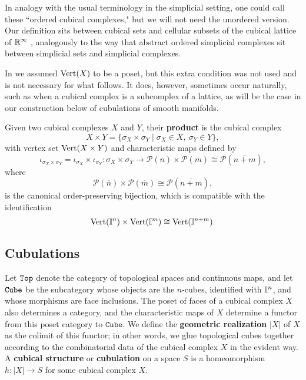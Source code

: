 In analogy with the usual terminology in the simplicial setting, one could call these ``ordered cubical complexes," but we will not need the unordered version.
Our definition sits between cubical sets \cite{jardine2002cubical} and cellular subsets of the cubical lattice of $\mathbb{R}^\infty$ \cite{kaczynski2006computational}, analogously to the way that abstract ordered simplicial complexes sit between simplicial sets and simplicial complexes.
\begin{comment}
	The following geometric realization construction makes our definition and the cubical lattice definition essentially equivalent.
\end{comment}

\begin{remark}
	In \cite{FMS-flows} we assumed ${\rm Vert}(X)$ to be a poset, but this extra condition was not used and is not necessary for what follows.
	It does, however, sometimes occur naturally, such as when a cubical complex is a subcomplex of a lattice, as will be the case in our construction below of cubulations of smooth manifolds.
\end{remark}

\noindent Given two cubical complexes $X$ and $Y$, their \textbf{product} is the cubical complex
\[
X \times Y = \{ \sigma_X \times \sigma_Y \mid \sigma_X \in X,\ \sigma_Y \in Y \},
\]
with vertex set ${\rm Vert}(X \times Y)$ and characteristic maps defined by
\[
\iota_{\sigma_X \times \sigma_Y} = \iota_{\sigma_X} \times \iota_{\sigma_Y} \colon \sigma_X \times \sigma_Y \to \mathcal{P}(\overline{n}) \times \mathcal{P}(\overline{m}) \cong \mathcal{P}(\overline{n + m}),
\]
where
\[
\mathcal{P}(\overline{n}) \times \mathcal{P}(\overline{m}) \cong \mathcal{P}(\overline{n + m}),
\]
is the canonical order-preserving bijection, which is compatible with the identification
\[
{\rm Vert}(\mathbb{I}^n) \times {\rm Vert}(\mathbb{I}^m) \cong {\rm Vert}(\mathbb{I}^{n + m}).
\]

\subsection{Cubulations}

Let ${\tt Top}$ denote the category of topological spaces and continuous maps, and let ${\tt Cube}$ be the subcategory whose objects are the $n$-cubes, identified with $\mathbb{I}^n$, and whose morphisms are face inclusions.
The poset of faces of a cubical complex $X$ also determines a category, and the characteristic maps of $X$ determine a functor from this poset category to $\mathtt{Cube}$.
We define the \textbf{geometric realization} $|X|$ of $X$ as the colimit of this functor; in other words, we glue topological cubes together according to the combinatorial data of the cubical complex $X$ in the evident way.
A \textbf{cubical structure} or \textbf{cubulation} on a space $S$ is a homeomorphism $h \colon |X| \to S$ for some cubical complex $X$.

